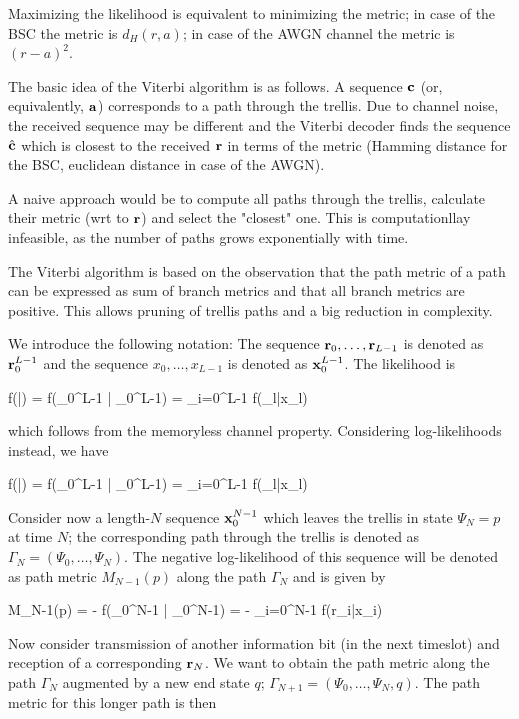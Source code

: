 Maximizing the likelihood is equivalent to minimizing the metric; in case of the BSC the metric is $d_H(r,a)$; in case of the AWGN channel the metric is $(r-a)^2$.

The basic idea of the Viterbi algorithm is as follows. A sequence $\mathbf{c}$ (or, equivalently, $\mathbf{a}$) corresponds to a path through the trellis. Due to channel noise, the received sequence may be different and the Viterbi decoder finds the sequence $\hat{\mathbf{c}}$ which is closest to the received $\mathbf{r}$ in terms of the metric (Hamming distance for the BSC, euclidean distance in case of the AWGN).

A naive approach would be to compute all paths through the trellis, calculate their metric (wrt to $\mathbf{r}$) and select the "closest" one. This is computationllay infeasible, as the number of paths grows exponentially with time.

The Viterbi algorithm is based on the observation that the path metric of a path can be expressed as sum of branch metrics and that all branch metrics are positive. This allows pruning of trellis paths and a big reduction in complexity.

We introduce the following notation: The sequence $\mathbf{r}_0,\ldots,\mathbf{r}_{L-1}$ is denoted as $\mathbf{r}_{0}^{L-1}$ and the sequence $x_0,\ldots,x_{L-1}$ is denoted as $\mathbf{x}_{0}^{L-1}$. The likelihood is

\bee
f(\rbf|\xbf) = f(\rbf_{0}^{L-1} | \rbf_{0}^{L-1}) = \prod_{i=0}^{L-1} f(\rbf_l|x_l)
\eee

which follows from the memoryless channel property. Considering log-likelihoods instead, we have

\bee
\log f(\rbf|\xbf) = \log f(\rbf_{0}^{L-1} | \rbf_{0}^{L-1}) = \sum_{i=0}^{L-1} \log f(\rbf_l|x_l)
\eee

Consider now a length-$N$ sequence $\mathbf{x}_{0}^{N-1}$ which leaves the trellis in state $\Psi_N = p$ at time $N$; the corresponding path through the trellis is denoted as $\Gamma_N = (\Psi_0,\ldots,\Psi_N)$. The negative log-likelihood of this sequence will be denoted as path metric $M_{N-1}(p)$ along the path $\Gamma_N$ and is given by

\bee
M_{N-1}(p) = - \log f(\rbf_{0}^{N-1} | \xbf_{0}^{N-1}) = - \sum_{i=0}^{N-1} \log f(r_i|x_i)
\eee

Now consider transmission of another information bit (in the next timeslot) and reception of a corresponding $\mathbf{r}_N$. We want to obtain the path metric along the path $\Gamma_N$ augmented by a new end state $q$; $\Gamma_{N+1} = (\Psi_0,\ldots,\Psi_N, q)$. The path metric for this longer path is then

